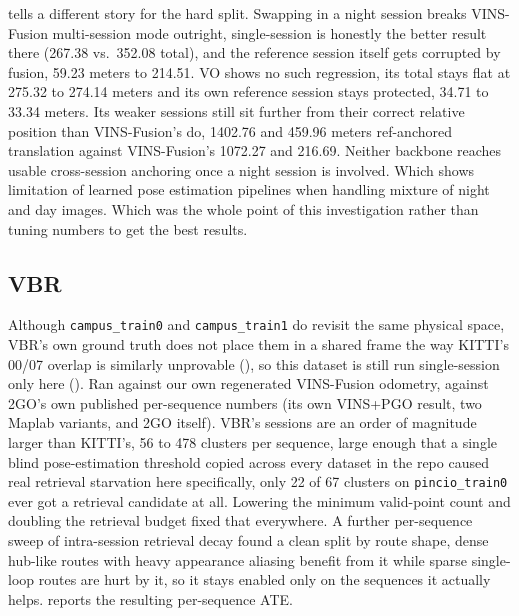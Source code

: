  tells a different story for the hard split. Swapping in a
night session breaks VINS-Fusion multi-session mode outright, single-session is honestly the better result there (267.38 vs.\ 352.08 total), and
the reference session itself gets corrupted by fusion, 59.23 meters to 214.51. VO shows no such
regression, its total stays flat at 275.32 to 274.14 meters and its own reference session stays
protected, 34.71 to 33.34 meters. Its weaker sessions still sit further from their correct
relative position than VINS-Fusion's do, 1402.76 and 459.96 meters ref-anchored translation
against VINS-Fusion's 1072.27 and 216.69. Neither backbone reaches usable cross-session anchoring
once a night session is involved. Which shows limitation of learned pose estimation pipelines when handling mixture of night and day images. Which was the whole point of this investigation rather than tuning numbers to get the best results.

\subsection{VBR}
\label{sec:experiments-main-vbr}

Although \texttt{campus\_train0} and \texttt{campus\_train1} do revisit the same physical space,
VBR's own ground truth does not place them in a shared frame the way KITTI's 00/07 overlap is
similarly unprovable (), so this dataset is still run
single-session only here (). Ran against our own regenerated
VINS-Fusion odometry, against 2GO's own published per-sequence numbers (its own VINS+PGO result,
two Maplab variants, and 2GO itself). VBR's sessions are an order of magnitude larger than KITTI's,
56 to 478 clusters per sequence, large enough that a
single blind pose-estimation threshold copied across every dataset in the repo caused real
retrieval starvation here specifically, only 22 of 67 clusters on \texttt{pincio\_train0} ever got
a retrieval candidate at all. Lowering the minimum valid-point count and doubling the retrieval
budget fixed that everywhere. A further per-sequence sweep of intra-session retrieval decay found
a clean split by route shape, dense hub-like routes with heavy appearance aliasing benefit from it
while sparse single-loop routes are hurt by it, so it stays enabled only on the sequences it
actually helps.  reports the resulting per-sequence ATE.

